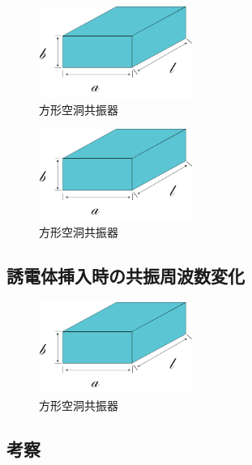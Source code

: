 \begin{figure}[h]
  \begin{center}
    \includegraphics[width=5cm]{./image/空洞共振器.png}
    \caption{方形空洞共振器}
    \label{fig:Cavity}
  \end{center}
\end{figure}

\vspace{10 mm}

\begin{figure}[h]
  \begin{center}
    \includegraphics[width=5cm]{./image/空洞共振器.png}
    \caption{方形空洞共振器}
    \label{fig:Cavity}
  \end{center}
\end{figure}

\subsection{誘電体挿入時の共振周波数変化}

\vspace{10 mm}

\begin{figure}[h]
  \begin{center}
    \includegraphics[width=5cm]{./image/空洞共振器.png}
    \caption{方形空洞共振器}
    \label{fig:Cavity}
  \end{center}
\end{figure}

\subsection{考察}
